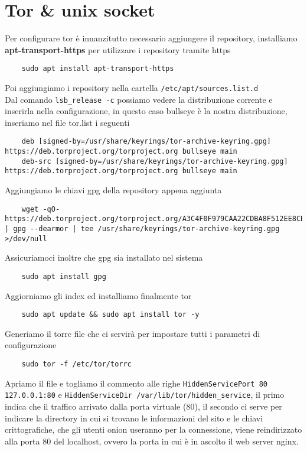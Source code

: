 \section{Tor \& unix socket}
Per configurare tor è innanzitutto necessario aggiungere il repository, installiamo \textbf{apt-transport-https} per utilizzare i repository tramite https
\begin{lstlisting}
    sudo apt install apt-transport-https
\end{lstlisting}
Poi aggiungiamo i repository nella cartella \lstinline{/etc/apt/sources.list.d} \\
Dal comando \lstinline{lsb_release -c} possiamo vedere la distribuzione corrente e inserirla nella configurazione, in questo caso bullseye è la nostra distribuzione, inseriamo nel file tor.list i seguenti 
\begin{lstlisting}
    deb [signed-by=/usr/share/keyrings/tor-archive-keyring.gpg] https://deb.torproject.org/torproject.org bullseye main
    deb-src [signed-by=/usr/share/keyrings/tor-archive-keyring.gpg] https://deb.torproject.org/torproject.org bullseye main
\end{lstlisting}
Aggiungiamo le chiavi gpg della repository appena aggiunta
\begin{lstlisting}
    wget -qO- https://deb.torproject.org/torproject.org/A3C4F0F979CAA22CDBA8F512EE8CBC9E886DDD89.asc | gpg --dearmor | tee /usr/share/keyrings/tor-archive-keyring.gpg >/dev/null
\end{lstlisting}
Assicuriamoci inoltre che gpg sia installato nel sistema
\begin{lstlisting}
    sudo apt install gpg
\end{lstlisting}
Aggiorniamo gli index ed installiamo finalmente tor
\begin{lstlisting}
    sudo apt update && sudo apt install tor -y 
\end{lstlisting} \cite{TorRepo}
Generiamo il torrc file che ci servirà per impostare tutti i parametri di configurazione 
\begin{lstlisting}
    sudo tor -f /etc/tor/torrc
\end{lstlisting}
Apriamo il file e togliamo il commento alle righe \lstinline{HiddenServicePort 80 127.0.0.1:80} e \lstinline{HiddenServiceDir /var/lib/tor/hidden_service}, il primo indica che il traffico arrivato dalla porta virtuale (80), il secondo ci serve per indicare la directory in cui si trovano le informazioni del sito e le chiavi crittografiche, che gli utenti onion useranno per la connessione, viene reindirizzato alla porta 80 del localhost, ovvero la porta in cui è in ascolto il web server nginx. \\
